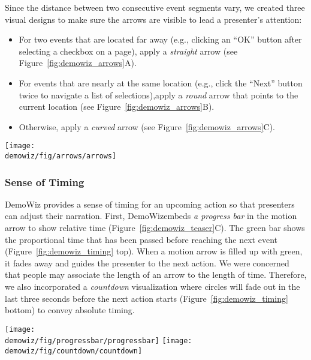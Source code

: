 Since the distance between two consecutive event segments vary, we created three visual designs to make sure the arrows are visible to lead a presenter's attention:

\begin{itemize}
  \item For two events that are located far away (e.g., clicking an ``OK'' button after selecting a checkbox on a page), apply a \textit{straight} arrow (see Figure~\ref{fig:demowiz_arrows}A).
  \item For events that are nearly at the same location (e.g., click the ``Next'' button twice to navigate a list of selections),apply a \textit{round} arrow that points to the current location (see Figure~\ref{fig:demowiz_arrows}B).
  \item Otherwise, apply a \textit{curved} arrow (see Figure~\ref{fig:demowiz_arrows}C).
\end{itemize}

\begin{figure*}[t]
  \centering
  \texttt{[image: \\demowiz/fig/arrows/arrows]}
  \caption{Three types of motion arrows in DemoWiz that guide presenters to the next event of different distances at a far (A), nearly the same (B), and near location (C).}
  \label{fig:demowiz_arrows}
\end{figure*}


\subsubsection{Sense of Timing}
DemoWiz provides a sense of timing for an upcoming action so that presenters can adjust their narration. First, DemoWizembeds \textit{a progress bar} in the motion arrow to show relative time (Figure~\ref{fig:demowiz_teaser}C). The green bar shows the proportional time that has been passed before reaching the next event (Figure~\ref{fig:demowiz_timing} top). When a motion arrow is filled up with green, it fades away and guides the presenter to the next action. We were concerned that people may associate the length of an arrow to the length of time. Therefore, we also incorporated a \textit{countdown} visualization where circles will fade out in the last three seconds before the next action starts (Figure~\ref{fig:demowiz_timing} bottom) to convey absolute timing.

\begin{figure*}[t]
  \centering
  \texttt{[image: \\demowiz/fig/progressbar/progressbar]}
  \texttt{[image: \\demowiz/fig/countdown/countdown]}
  \caption{A progress in time guides the presenter from the current event (left) gradually to the upcoming action (right) using relative timing with a progress bar (top) and absolute timing (bottom).}
  \label{fig:demowiz_timing}
\end{figure*}

